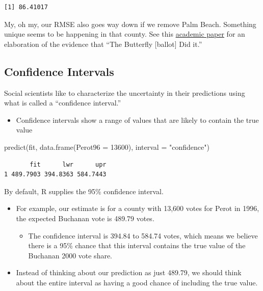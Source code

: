 \documentclass[
  letterpaper,
  DIV=11,
  numbers=noendperiod]{scrreprt}
\newenvironment{Shaded}{\begin{snugshade}}{\end{snugshade}}
\newcommand{\AttributeTok}[1]{\textcolor[rgb]{0.40,0.45,0.13}{#1}}
\newcommand{\DecValTok}[1]{\textcolor[rgb]{0.68,0.00,0.00}{#1}}
\newcommand{\FunctionTok}[1]{\textcolor[rgb]{0.28,0.35,0.67}{#1}}
\newcommand{\NormalTok}[1]{\textcolor[rgb]{0.00,0.23,0.31}{#1}}
\newcommand{\StringTok}[1]{\textcolor[rgb]{0.13,0.47,0.30}{#1}}
\providecommand{\tightlist}{%
  \setlength{\itemsep}{0pt}\setlength{\parskip}{0pt}}\usepackage{longtable,booktabs,array}
\begin{document}
\begin{verbatim}
[1] 86.41017
\end{verbatim}

My, oh my, our RMSE also goes way down if we remove Palm Beach.
Something unique seems to be happening in that county. See this
\href{http://sekhon.berkeley.edu/papers/butterfly.pdf}{academic paper}
for an elaboration of the evidence that ``The Butterfly {[}ballot{]} Did
it.''

\hypertarget{confidence-intervals}{%
\subsection{Confidence Intervals}\label{confidence-intervals}}

Social scientists like to characterize the uncertainty in their
predictions using what is called a ``confidence interval.''

\begin{itemize}
\tightlist
\item
  Confidence intervals show a range of values that are likely to contain
  the true value
\end{itemize}

\begin{Shaded}
\begin{Highlighting}[]
\FunctionTok{predict}\NormalTok{(fit, }\FunctionTok{data.frame}\NormalTok{(}\AttributeTok{Perot96 =} \DecValTok{13600}\NormalTok{), }\AttributeTok{interval =} \StringTok{"confidence"}\NormalTok{)}
\end{Highlighting}
\end{Shaded}

\begin{verbatim}
       fit      lwr      upr
1 489.7903 394.8363 584.7443
\end{verbatim}

By default, R supplies the 95\% confidence interval.

\begin{itemize}
\tightlist
\item
  For example, our estimate is for a county with 13,600 votes for Perot
  in 1996, the expected Buchanan vote is 489.79 votes.

  \begin{itemize}
  \tightlist
  \item
    The confidence interval is 394.84 to 584.74 votes, which means we
    believe there is a 95\% chance that this interval contains the true
    value of the Buchanan 2000 vote share.
  \end{itemize}
\item
  Instead of thinking about our prediction as just 489.79, we should
  think about the entire interval as having a good chance of including
  the true value.
\end{itemize}
\end{document}
